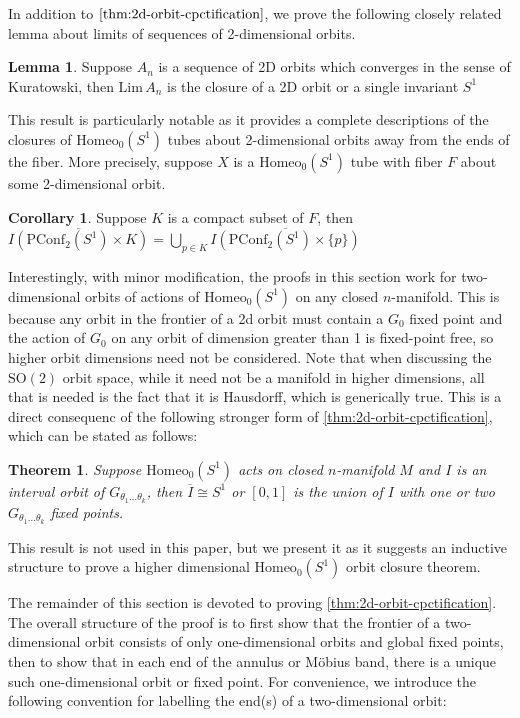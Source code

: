 \documentclass[10pt, oneside]{article}
\newcommand{\SO}[1][2]{\text{SO}(#1)}
\newcommand{\homeo}[1][S^1]{\text{Homeo}_0(#1)}
\newcommand{\cl}[1]{\overline{#1}}
\newcommand{\pconf}[2][S^1]{\text{PConf}_{#2}(#1)}
\newcommand{\klim}[1]{\text{Lim}\,#1}
\newtheorem{thm}{Theorem}[section]
\theoremstyle{definition}
\newtheorem{lem}{Lemma}[section]
\newtheorem{cor}{Corollary}[section]
\theoremstyle{definition}
\begin{document}
In addition to $\cref{thm:2d-orbit-cpctification}$, we prove the following closely related lemma about limits of sequences of 2-dimensional orbits.

\begin{lem}\label{lem:seq-of-annuli}
    Suppose $A_n$ is a sequence of 2D orbits which converges in the sense of Kuratowski, then $\klim A_n$ is the closure of a 2D orbit or a single invariant $S^1$
\end{lem}

This result is particularly notable as it provides a complete descriptions of the closures of $\homeo$ tubes about 2-dimensional orbits away from the ends of the fiber. More precisely, suppose $X$ is a $\homeo$ tube with fiber $F$ about some 2-dimensional orbit. 

\begin{cor}\label{cor:cpct-tube-boundary}
    Suppose $K$ is a compact subset of $F$, then $\cl{I(\pconf{2}\times K)} = \bigcup_{p\in K} \cl{I(\pconf{2}\times \{p\})}$
\end{cor}

Interestingly, with minor modification, the proofs in this section work for two-dimensional orbits of actions of $\homeo$ on any closed $n$-manifold. This is because any orbit in the frontier of a 2d orbit must contain a $G_0$ fixed point and the action of $G_0$ on any orbit of dimension greater than 1 is fixed-point free, so higher orbit dimensions need not be considered. Note that when discussing the $\SO$ orbit space, while it need not be a manifold in higher dimensions, all that is needed is the fact that it is Hausdorff, which is generically true. This is a direct consequenc of the following stronger form of \cref{thm:2d-orbit-cpctification}, which can be stated as follows:

\begin{thm}
    Suppose $\homeo$ acts on closed $n$-manifold $M$ and $I$ is an interval orbit of $G_{\theta_1\dots\theta_k}$, then $\cl{I}\cong S^1$ or $[0,1]$ is the union of $I$ with one or two $G_{\theta_1\dots\theta_k}$ fixed points.
\end{thm}

This result is not used in this paper, but we present it as it suggests an inductive structure to prove a higher dimensional $\homeo$ orbit closure theorem.

The remainder of this section is devoted to proving \cref{thm:2d-orbit-cpctification}. The overall structure of the proof is to first show that the frontier of a two-dimensional orbit consists of only one-dimensional orbits and global fixed points, then to show that in each end of the annulus or M\"{o}bius band, there is a unique such one-dimensional orbit or fixed point. For convenience, we introduce the following convention for labelling the end(s) of a two-dimensional orbit:
\end{document}
